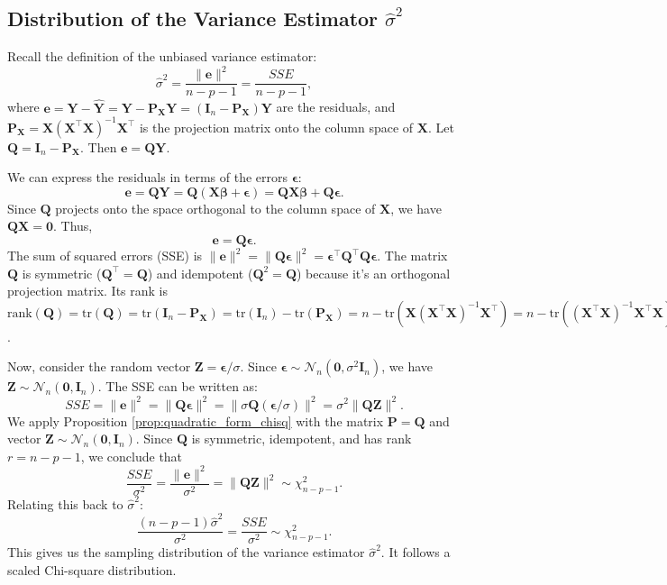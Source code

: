 \documentclass[11pt, letterpaper]{article}
\theoremstyle{plain} %
\theoremstyle{definition} %
\theoremstyle{remark} %
\renewcommand{\mathbf}{\boldsymbol} %
\newcommand{\tr}{\mathrm{tr}}
\newcommand{\rank}{\mathrm{rank}}
\newcommand{\Normal}{\mathcal{N}}
\newcommand{\Chisq}{\chi^2}
\newcommand{\I}{\mathbf{I}} %
\begin{document}
\subsection{Distribution of the Variance Estimator $\hat{\sigma}^2$}

Recall the definition of the unbiased variance estimator:
\[
\hat{\sigma}^2 = \frac{\|\boldsymbol{e}\|^2}{n-p-1} = \frac{SSE}{n-p-1},
\]
where $\boldsymbol{e} = \boldsymbol{Y} - \hat{\boldsymbol{Y}} = \boldsymbol{Y} - \boldsymbol{P_X}\boldsymbol{Y} = (\I_n - \boldsymbol{P_X})\boldsymbol{Y}$ are the residuals, and $\boldsymbol{P_X} = \boldsymbol{X}(\boldsymbol{X}^{\top}\boldsymbol{X})^{-1}\boldsymbol{X}^{\top}$ is the projection matrix onto the column space of $\boldsymbol{X}$. Let $\boldsymbol{Q} = \I_n - \boldsymbol{P_X}$. Then $\boldsymbol{e} = \boldsymbol{Q}\boldsymbol{Y}$.

We can express the residuals in terms of the errors $\boldsymbol{\epsilon}$:
\[
\boldsymbol{e} = \boldsymbol{Q}\boldsymbol{Y} = \boldsymbol{Q}(\boldsymbol{X}\boldsymbol{\beta} + \boldsymbol{\epsilon}) = \boldsymbol{Q}\boldsymbol{X}\boldsymbol{\beta} + \boldsymbol{Q}\boldsymbol{\epsilon}.
\]
Since $\boldsymbol{Q}$ projects onto the space orthogonal to the column space of $\boldsymbol{X}$, we have $\boldsymbol{Q}\boldsymbol{X} = \mathbf{0}$. Thus,
\[
\boldsymbol{e} = \boldsymbol{Q}\boldsymbol{\epsilon}.
\]
The sum of squared errors (SSE) is $\|\boldsymbol{e}\|^2 = \|\boldsymbol{Q}\boldsymbol{\epsilon}\|^2 = \boldsymbol{\epsilon}^{\top}\boldsymbol{Q}^{\top}\boldsymbol{Q}\boldsymbol{\epsilon}$.
The matrix $\boldsymbol{Q}$ is symmetric ($\boldsymbol{Q}^{\top}=\boldsymbol{Q}$) and idempotent ($\boldsymbol{Q}^2 = \boldsymbol{Q}$) because it's an orthogonal projection matrix. Its rank is $\rank(\boldsymbol{Q}) = \tr(\boldsymbol{Q}) = \tr(\I_n - \boldsymbol{P_X}) = \tr(\I_n) - \tr(\boldsymbol{P_X}) = n - \tr(\boldsymbol{X}(\boldsymbol{X}^{\top}\boldsymbol{X})^{-1}\boldsymbol{X}^{\top}) = n - \tr((\boldsymbol{X}^{\top}\boldsymbol{X})^{-1}\boldsymbol{X}^{\top}\boldsymbol{X}) = n - \tr(\I_{p+1}) = n - (p+1)$.

Now, consider the random vector $\boldsymbol{Z} = \boldsymbol{\epsilon}/\sigma$. Since $\boldsymbol{\epsilon} \sim \Normal_n(\mathbf{0}, \sigma^2\I_n)$, we have $\boldsymbol{Z} \sim \Normal_n(\mathbf{0}, \I_n)$. The SSE can be written as:
\[
SSE = \|\boldsymbol{e}\|^2 = \|\boldsymbol{Q}\boldsymbol{\epsilon}\|^2 = \| \sigma \boldsymbol{Q} (\boldsymbol{\epsilon}/\sigma) \|^2 = \sigma^2 \|\boldsymbol{Q}\boldsymbol{Z}\|^2.
\]
We apply Proposition \ref{prop:quadratic_form_chisq} with the matrix $\boldsymbol{P}=\boldsymbol{Q}$ and vector $\boldsymbol{Z} \sim \Normal_n(\mathbf{0}, \I_n)$. Since $\boldsymbol{Q}$ is symmetric, idempotent, and has rank $r = n-p-1$, we conclude that
\[
\frac{SSE}{\sigma^2} = \frac{\|\boldsymbol{e}\|^2}{\sigma^2} = \|\boldsymbol{Q}\boldsymbol{Z}\|^2 \sim \Chisq_{n-p-1}.
\]
Relating this back to $\hat{\sigma}^2$:
\[
\frac{(n-p-1)\hat{\sigma}^2}{\sigma^2} = \frac{SSE}{\sigma^2} \sim \Chisq_{n-p-1}.
\]
This gives us the sampling distribution of the variance estimator $\hat{\sigma}^2$. It follows a scaled Chi-square distribution.
\end{document}
